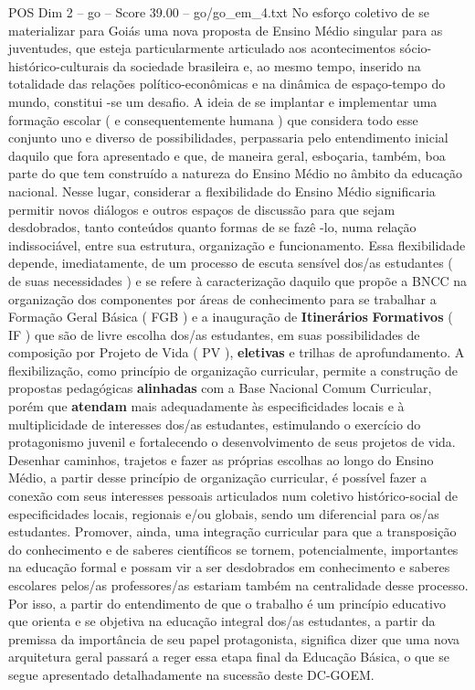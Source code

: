 \begin{textsample}{POS Dim 2 – go – Score 39.00 – go/go\_em\_4.txt}
No esforço coletivo de se materializar para Goiás uma nova proposta de Ensino Médio singular para as juventudes, que esteja particularmente articulado aos acontecimentos sócio-histórico-culturais da sociedade brasileira e, ao mesmo tempo, inserido na totalidade das relações político-econômicas e na dinâmica de espaço-tempo do mundo, constitui -se um desafio.
A ideia de se implantar e implementar uma formação escolar ( e consequentemente humana ) que considera todo esse conjunto uno e diverso de possibilidades, perpassaria pelo entendimento inicial daquilo que fora apresentado e que, de maneira geral, esboçaria, também, boa parte do que tem construído a natureza do Ensino Médio no âmbito da educação nacional.
Nesse lugar, considerar a flexibilidade do Ensino Médio significaria permitir novos diálogos e outros espaços de discussão para que sejam desdobrados, tanto conteúdos quanto formas de se fazê -lo, numa relação indissociável, entre sua estrutura, organização e funcionamento.
Essa flexibilidade depende, imediatamente, de um processo de escuta sensível dos/as estudantes ( de suas necessidades ) e se refere à caracterização daquilo que propõe a BNCC na organização dos componentes por áreas de conhecimento para se trabalhar a Formação Geral Básica ( FGB ) e a inauguração de \textbf{Itinerários} \textbf{Formativos} ( IF ) que são de livre escolha dos/as estudantes, em suas possibilidades de composição por Projeto de Vida ( PV ), \textbf{eletivas} e trilhas de aprofundamento.
A flexibilização, como princípio de organização curricular, permite a construção de propostas pedagógicas \textbf{alinhadas} com a Base Nacional Comum Curricular, porém que \textbf{atendam} mais adequadamente às especificidades locais e à multiplicidade de interesses dos/as estudantes, estimulando o exercício do protagonismo juvenil e fortalecendo o desenvolvimento de seus projetos de vida.
Desenhar caminhos, trajetos e fazer as próprias escolhas ao longo do Ensino Médio, a partir desse princípio de organização curricular, é possível fazer a conexão com seus interesses pessoais articulados num coletivo histórico-social de especificidades locais, regionais e/ou globais, sendo um diferencial para os/as estudantes.
Promover, ainda, uma integração curricular para que a transposição do conhecimento e de saberes científicos se tornem, potencialmente, importantes na educação formal e possam vir a ser desdobrados em conhecimento e saberes escolares pelos/as professores/as estariam também na centralidade desse processo.
Por isso, a partir do entendimento de que o trabalho é um princípio educativo que orienta e se objetiva na educação integral dos/as estudantes, a partir da premissa da importância de seu papel protagonista, significa dizer que uma nova arquitetura geral passará a reger essa etapa final da Educação Básica, o que se segue apresentado detalhadamente na sucessão deste DC-GOEM.


\end{textsample}
